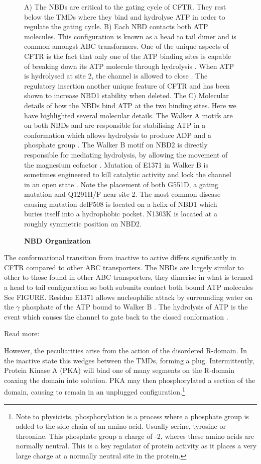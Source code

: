 \begin{figure}
	\caption[NBD Organisation] {\textbf{NBD Organization}}{A) The NBDs are critical to the gating cycle of CFTR. They rest below the TMDs where they bind and hydrolyse ATP in order to regulate the gating cycle. B) Each NBD contacts both ATP molecules. This configuration is known as a head to tail dimer and is common amongst ABC transformers. One of the unique aspects of CFTR is the fact that only one of the ATP binding sites is capable of breaking down its ATP molecule through hydrolysis \cite{stratford2007}. When ATP is hydrolysed at site 2, the channel is allowed to close \cite{infield2021}. The regulatory insertion another unique feature of CFTR and has been shown to increase NBD1 stability when deleted. The  C) Molecular details of how the NBDs bind ATP at the two binding sites. Here we have highlighted several molecular details. The Walker A motifs are on both NBDs and are responsible for stabilising ATP in a conformation which allows hydrolysis to produce ADP and a phosphate group \cite{deltoro2016}. The Walker B motif on NBD2 is directly responsible for mediating hydrolysis, by allowing the movement of the magnesium cofactor \cite{urbatsch2000, rai2006}. Mutation of E1371 in Walker B is sometimes engineered to kill catalytic activity and lock the channel in an open state \cite{stratford2007, zhang2018}. Note the placement of both G551D, a gating mutation and Q1291H/F near site 2. The most common disease causing mutation delF508 is located on a helix of NBD1 which buries itself into a hydrophobic pocket. N1303K is located at a roughly symmetric position on NBD2.   } 

\end{figure}

The conformational transition from inactive to active differs significantly in CFTR compared to other ABC transporters. The NBDs are largely similar to other to those found in other ABC transporters, they dimerise in what is termed a head to tail configuration so both subunits contact both bound ATP molecules \cite{} See FIGURE. Residue E1371 allows nucleophilic attack by surrounding water on the $\gamma$ phosphate  of the ATP bound to Walker B \cite{stratford2007}. The hydrolysis of ATP is the event which causes the channel to gate back to the closed conformation \cite{}. 


Read more: \cite{ramjeesingh1999}

However, the peculiarities arise from the action of the disordered R-domain. In the inactive state this wedges between the TMDs, forming a plug. Intermittently, Protein Kinase A (PKA) will bind one of many segments on the R-domain coaxing the domain into solution. PKA may then phosphorylated a section of the domain, causing to remain in an unplugged configuration.\footnote{Note to physicists, phosphorylation is a process where a phosphate group is added to the side chain of an amino acid. Usually serine, tyrosine or threonine. This phosphate group a charge of -2, wheres these amino acids are normally neutral. This is a key regulator of protein activity as it places a very large charge at a normally neutral site in the protein.}

